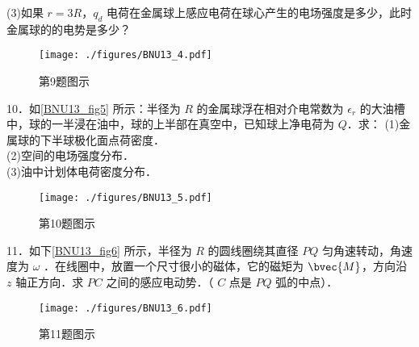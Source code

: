 (3)如果 $r=3R$，$q_d$ 电荷在金属球上感应电荷在球心产生的电场强度是多少，此时金属球的的电势是多少？
\begin{figure}[ht]
\centering
\texttt{[image: ./figures/BNU13\_4.pdf]}
\caption{第9题图示} \label{BNU13_fig4}
\end{figure}
10．如\autoref{BNU13_fig5} 所示：半径为 $R$ 的金属球浮在相对介电常数为 $\epsilon_r$ 的大油槽中，球的一半浸在油中，球的上半部在真空中，已知球上净电荷为 $Q$．求：
(1)金属球的下半球极化面点荷密度．\\
(2)空间的电场强度分布．\\
(3)油中计划体电荷密度分布．
\begin{figure}[ht]
\centering
\texttt{[image: ./figures/BNU13\_5.pdf]}
\caption{第10题图示} \label{BNU13_fig5}
\end{figure}
11．如下\autoref{BNU13_fig6} 所示，半径为 $R$ 的圆线圈绕其直径 $PQ$ 匀角速转动，角速度为 $\omega$ ．在线圈中，放置一个尺寸很小的磁体，它的磁矩为 $
\bvec{M}$，方向沿 $z$ 轴正方向．求 $PC$ 之间的感应电动势．（ $C$ 点是 $PQ$ 弧的中点）．
\begin{figure}[ht]
\centering
\texttt{[image: ./figures/BNU13\_6.pdf]}
\caption{第11题图示} \label{BNU13_fig6}
\end{figure}